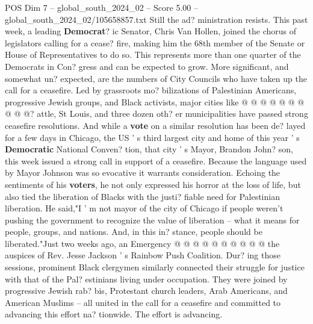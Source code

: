 \begin{textsample}{POS Dim 7 – global\_south\_2024\_02 – Score 5.00 – global\_south\_2024\_02/105658857.txt}
Still the ad? ministration resists.
This past week, a leading \textbf{Democrat}? ic Senator, Chris Van Hollen, joined the chorus of legislators calling for a cease? fire, making him the 68th member of the Senate or House of Representatives to do so.
This represents more than one quarter of the Democrats in Con? gress and can be expected to grow.
More significant, and somewhat un? expected, are the numbers of City Councils who have taken up the call for a ceasefire.
Led by grassroots mo? bilizations of Palestinian Americans, progressive Jewish groups, and Black activists, major cities like @ @ @ @ @ @ @ @ @ @? attle, St Louis, and three dozen oth? er municipalities have passed strong ceasefire resolutions.
And while a \textbf{vote} on a similar resolution has been de? layed for a few days in Chicago, the US ' s third largest city and home of this year ' s \textbf{Democratic} National Conven? tion, that city ' s Mayor, Brandon John? son, this week issued a strong call in support of a ceasefire.
Because the language used by Mayor Johnson was so evocative it warrants consideration.
Echoing the sentiments of his \textbf{voters}, he not only expressed his horror at the loss of life, but also tied the liberation of Blacks with the justi? fiable need for Palestinian liberation.
He said,"I ' m not mayor of the city of Chicago if people weren't pushing the government to recognize the value of liberation -- what it means for people, groups, and nations.
And, in this in? stance, people should be liberated."Just two weeks ago, an Emergency @ @ @ @ @ @ @ @ @ @ the auspices of Rev.
Jesse Jackson ' s Rainbow Push Coalition.
Dur? ing those sessions, prominent Black clergymen similarly connected their struggle for justice with that of the Pal? estinians living under occupation.
They were joined by progressive Jewish rab? bis, Protestant church leaders, Arab Americans, and American Muslims -- all united in the call for a ceasefire and committed to advancing this effort na? tionwide.
The effort is advancing.

\end{textsample}
